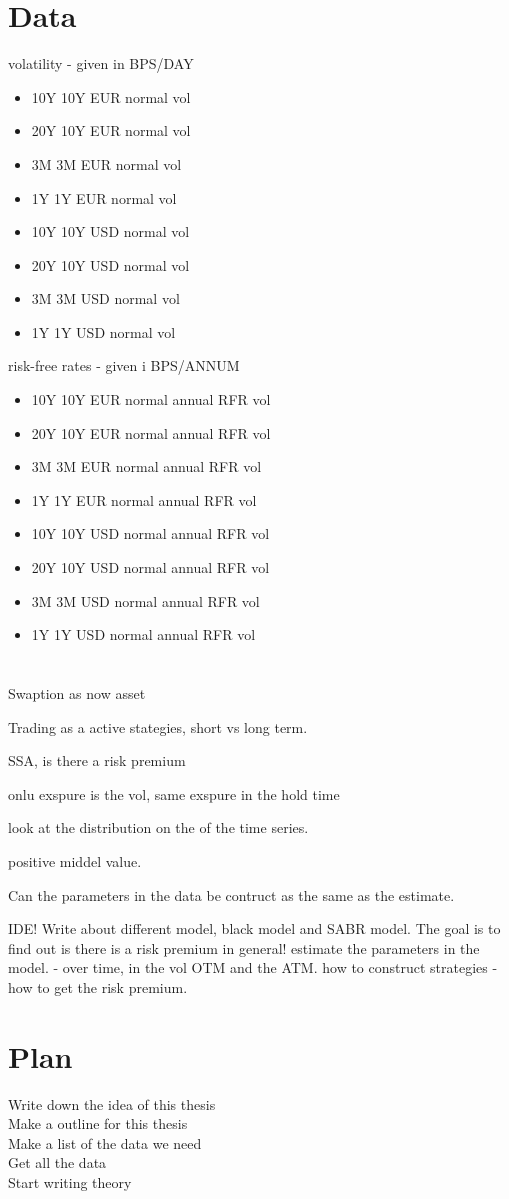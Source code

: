 \documentclass{article}
\begin{document}
\section{Data}
volatility  - given in BPS/DAY
\begin{itemize}
  \item 10Y 10Y EUR normal vol 
  \item 20Y 10Y EUR normal vol 
  \item 3M 3M EUR normal vol
  \item 1Y 1Y EUR normal vol 
  \item 10Y 10Y USD normal vol 
  \item 20Y 10Y USD normal vol 
  \item 3M 3M USD normal vol
  \item 1Y 1Y USD normal vol 
\end{itemize}
risk-free rates - given i BPS/ANNUM
\begin{itemize}
  \item 10Y 10Y EUR normal annual RFR vol 
  \item 20Y 10Y EUR normal annual RFR vol  
  \item 3M 3M EUR normal annual RFR vol 
  \item 1Y 1Y EUR normal annual RFR vol  
  \item 10Y 10Y USD normal annual RFR vol  
  \item 20Y 10Y USD normal annual RFR vol  
  \item 3M 3M USD normal annual RFR vol 
  \item 1Y 1Y USD normal annual RFR vol  
\end{itemize}


\section{}

Swaption as now asset

Trading as a active stategies, short vs long term. 

SSA, is there a risk premium

onlu exspure is the vol, same exspure in the hold time

look at the distribution on the of the time series. 

positive middel value. 

Can the parameters in the data be contruct as the same as the estimate. 


IDE! 
Write about different model, black model and SABR model. 
The goal is to find out is there is a risk premium in general!
estimate the parameters in the model. 
- over time, in the vol OTM and the ATM. 
how to construct strategies
-how to get the risk premium.


\section{Plan}

Write down the idea of this thesis \\
Make a outline for this thesis \\
Make a list of the data we need \\
Get all the data \\
Start writing theory 
\end{document}
